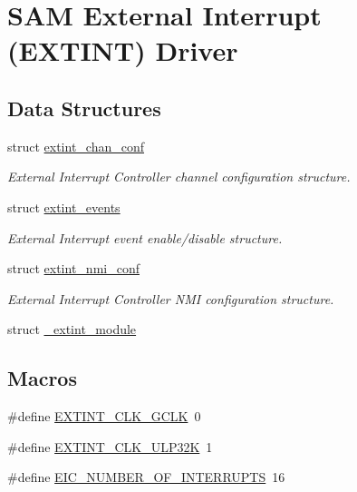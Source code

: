\hypertarget{group__asfdoc__sam0__extint__group}{}\section{S\+AM External Interrupt (E\+X\+T\+I\+NT) Driver}
\label{group__asfdoc__sam0__extint__group}
\subsection*{Data Structures}
\begin{DoxyCompactItemize}
\item 
struct \mbox{\hyperlink{structextint__chan__conf}{extint\+\_\+chan\+\_\+conf}}
\begin{DoxyCompactList}\small\item\em External Interrupt Controller channel configuration structure. \end{DoxyCompactList}\item 
struct \mbox{\hyperlink{structextint__events}{extint\+\_\+events}}
\begin{DoxyCompactList}\small\item\em External Interrupt event enable/disable structure. \end{DoxyCompactList}\item 
struct \mbox{\hyperlink{structextint__nmi__conf}{extint\+\_\+nmi\+\_\+conf}}
\begin{DoxyCompactList}\small\item\em External Interrupt Controller N\+MI configuration structure. \end{DoxyCompactList}\item 
struct \mbox{\hyperlink{struct__extint__module}{\+\_\+extint\+\_\+module}}
\end{DoxyCompactItemize}
\subsection*{Macros}
\begin{DoxyCompactItemize}
\item 
\#define \mbox{\hyperlink{group__asfdoc__sam0__extint__group_gaacc51accf9c1d264308d704a0fa72cca}{E\+X\+T\+I\+N\+T\+\_\+\+C\+L\+K\+\_\+\+G\+C\+LK}}~0
\item 
\#define \mbox{\hyperlink{group__asfdoc__sam0__extint__group_gac6728bce00136d52dedeffc38f0570d4}{E\+X\+T\+I\+N\+T\+\_\+\+C\+L\+K\+\_\+\+U\+L\+P32K}}~1
\item 
\#define \mbox{\hyperlink{group__asfdoc__sam0__extint__group_ga4388f6f166f07c60940ec351a8eb1bac}{E\+I\+C\+\_\+\+N\+U\+M\+B\+E\+R\+\_\+\+O\+F\+\_\+\+I\+N\+T\+E\+R\+R\+U\+P\+TS}}~16
\end{DoxyCompactItemize}
